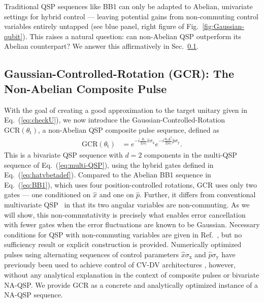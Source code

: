 \documentclass[aps,prx,showpacs,notitlepage,twocolumn,superscriptaddress,nofootinbib,preprintnumbers,floatfix,10pt, longbibliography]{revtex4-2}
\begin{document}
Traditional QSP sequences like BB1 can only be adapted to Abelian, univariate settings for hybrid control --- leaving potential gains from non-commuting control variables entirely untapped (see blue panel, right figure of 
Fig.~\ref{fig:Gaussian-qubit}). This raises a natural question: can non-Abelian QSP outperform its Abelian counterpart? We answer this affirmatively in Sec.~\ref{sec:GCR}.


\subsection{Gaussian-Controlled-Rotation (GCR): The Non-Abelian Composite Pulse}
\label{sec:GCR}

With the goal of creating a good approximation to the target unitary given in Eq.~(\ref{eq:checkU}), we now introduce the Gaussian-Controlled-Rotation $\mathrm{GCR}(\theta_\mathrm{t})$, a non-Abelian QSP composite pulse sequence, defined as
\begin{align}
\mathrm{GCR}(\theta_\mathrm{t})
  &= e^{-i\frac{\theta_\mathrm{t}}{2|\alpha|}\hat{x}\sigma_{\mathrm{x}}}
     e^{-i\frac{\theta_\mathrm{t}\Delta^2}{2|\alpha|}\hat{p}\sigma_{\mathrm{y}}}
     \label{eq:GCR}.
\end{align}
This is a bivariate QSP sequence with $d=2$ components in the multi-QSP sequence of Eq.~(\ref{eq:multi-QSP}), using the hybrid gates defined in Eq.~(\ref{eq:hatvbetadef}). Compared to the Abelian BB1 sequence in Eq.~(\ref{eq:BB1}), which uses four position-controlled rotations, GCR uses only two gates --- one conditioned on $\hat{x}$ and one on $\hat{p}$. Further, it differs from conventional multivariate QSP~\cite{rossi2022multivariable} in that its two angular variables are non-commuting. As we will show, this non-commutativity is precisely what enables error cancellation with fewer gates when the error fluctuations are known to be Gaussian. Necessary conditions for QSP with non-commuting variables are given in Ref.~\cite{nemeth2023variants}, but no sufficiency result or explicit construction is provided. Numerically optimized pulses using alternating sequences of control parameters $\hat x\sigma_\mathrm{x}$ and $\hat p\sigma_\mathrm{y}$ have previously been used to achieve control of CV-DV architectures \cite{hastrup2021improved,hastrup2021measurement}, however, without any analytical explanation in the context of composite pulses or bivariate NA-QSP.   We provide GCR as a concrete and analytically optimized instance of a NA-QSP sequence. 
\end{document}
